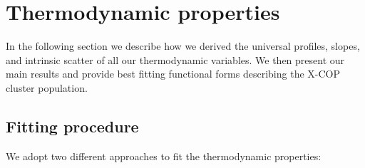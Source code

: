\documentclass[traditabstract   ]{aa} %
\begin{document}
\section{Thermodynamic properties}
\label{sec:thermo}

In the following section we describe how we derived the universal profiles, slopes, and intrinsic scatter of all our thermodynamic variables. We then present our main results and provide best fitting functional forms describing the X-COP cluster population.

\subsection{Fitting procedure}

We adopt two different approaches to fit the thermodynamic properties:
\end{document}
